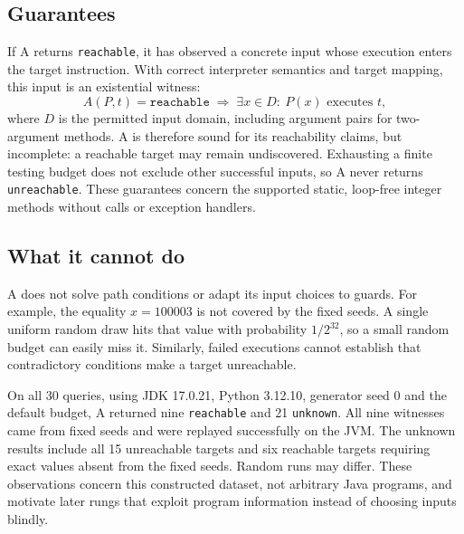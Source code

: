 \subsection{Guarantees}
If A returns \texttt{reachable}, it has observed a concrete input whose
execution enters the target instruction. With correct interpreter semantics
and target mapping, this input is an existential witness:
\[
    A(P,t)=\texttt{reachable}
    \;\Longrightarrow\;
    \exists x \in D:\ P(x)\mbox{ executes }t,
\]
where $D$ is the permitted input domain, including argument pairs for
two-argument methods. A is therefore sound for its reachability claims,
but incomplete: a reachable target may remain undiscovered.
Exhausting a finite testing budget does not exclude other successful inputs,
so A never returns \texttt{unreachable}. These guarantees concern the supported
static, loop-free integer methods without calls or exception handlers.

\subsection{What it cannot do}
A does not solve path conditions or adapt its input choices to guards.
For example, the equality $x=100003$ is not covered by the fixed seeds.
A single uniform random draw hits that value with probability $1/2^{32}$,
so a small random budget can easily miss it. Similarly, failed executions
cannot establish that contradictory conditions make a target unreachable.

On all 30 queries, using JDK 17.0.21, Python 3.12.10, generator seed 0 and
the default budget, A returned nine \texttt{reachable} and 21 \texttt{unknown}.
All nine witnesses came from fixed seeds and were replayed successfully on
the JVM. The unknown results include all 15 unreachable targets and six
reachable targets requiring exact values absent from the fixed seeds.
Random runs may differ. These observations concern this constructed dataset,
not arbitrary Java programs, and motivate later rungs that exploit program
information instead of choosing inputs blindly.
